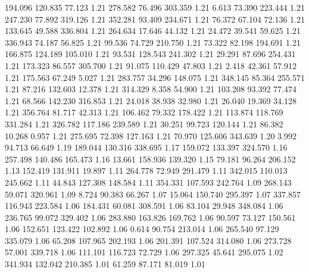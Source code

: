  194.096  120.835   77.123         1.21
 278.582   76.496  303.359         1.21
   6.613   73.390  223.444         1.21
 247.230   77.892  319.126         1.21
 352.281   93.409  234.671         1.21
  76.372   67.104   72.136         1.21
 133.645   49.588  336.804         1.21
 264.634   17.646   44.132         1.21
  24.472   39.541   59.625         1.21
 336.943   74.187   56.825         1.21
  99.536   74.729  210.750         1.21
  73.322   82.198  194.691         1.21
 166.875  124.189  105.010         1.21
  93.531  128.543  241.302         1.21
  29.291   87.696  254.431         1.21
 173.323   86.557  305.700         1.21
  91.075  110.429   47.803         1.21
   2.418   42.361   57.912         1.21
 175.563   67.249    5.027         1.21
 283.757   34.296  148.075         1.21
 348.145   85.364  255.571         1.21
  87.216  132.603   12.378         1.21
 314.329    8.358   54.900         1.21
 103.208   93.392   77.474         1.21
  68.566  142.230  316.853         1.21
  24.018   38.938   32.980         1.21
  26.040   19.369   34.128         1.21
 356.764   81.717   42.313         1.21
 106.462   79.332  178.422         1.21
 113.874  118.769  331.284         1.21
 326.782  117.186  239.589         1.21
  30.251   99.723  120.144         1.21
  86.382   10.268    0.957         1.21
 275.695   72.398  127.163         1.21
  70.970  125.606  343.639         1.20
   3.992   94.713   66.649         1.19
 189.044  130.316  338.695         1.17
 159.072  133.397  324.570         1.16
 257.498  140.486  165.473         1.16
  13.661  158.936  139.320         1.15
  79.181   96.264  206.152         1.13
 152.419  131.911   19.897         1.11
 264.778   72.949  291.479         1.11
 342.015  110.013  245.662         1.11
  44.843  127.308  148.584         1.11
 354.331  107.593  242.764         1.09
 268.143   59.071  320.961         1.09
   8.724   90.383   66.267         1.07
  15.064  150.740  295.397         1.07
 337.857  116.943  223.584         1.06
 184.431   60.081  308.591         1.06
  83.104   29.948  348.084         1.06
 236.765   99.072  329.402         1.06
 283.880  163.826  169.762         1.06
  90.597   73.127  150.561         1.06
 152.651  123.422  102.892         1.06
   0.614   90.754  213.014         1.06
 265.540   97.129  335.079         1.06
  65.208  107.965  202.193         1.06
 201.391  107.524  314.080         1.06
 273.728   57.001  339.718         1.06
 111.101  116.723   72.729         1.06
 297.325   45.641  295.075         1.02
 341.934  132.042  210.385         1.01
  61.259   87.171   81.019         1.01

